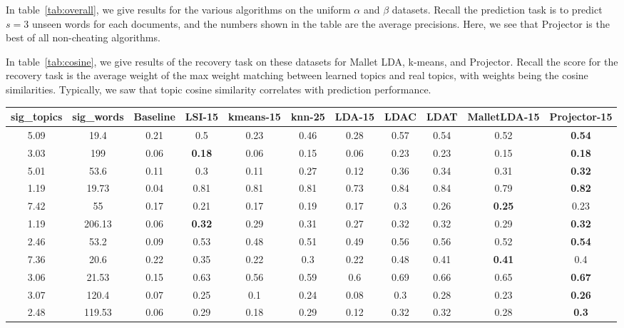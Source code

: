 In table~\ref{tab:overall}, we give results for the various algorithms on the uniform $\alpha$ and $\beta$ datasets. Recall the prediction task is to predict $s=3$ unseen words for each documents, and the numbers shown in the table are the average precisions. Here, we see that Projector is the best of all non-cheating algorithms. 

In table~\ref{tab:cosine}, we give results of the recovery task on these datasets for Mallet LDA, k-means, and Projector. Recall the score for the recovery task is the average weight of the max weight matching between learned topics and real topics, with weights being the cosine similarities. Typically, we saw that topic cosine similarity correlates with prediction performance.

\begin{table}
{\small
\begin{tabular}{|c|c|c|c|c|c|c|c|c|c|c|}
\hline 
sig\_topics &sig\_words &Baseline &LSI-15 &kmeans-15 &knn-25 &LDA-15 &LDAC &LDAT &MalletLDA-15 &Projector-15 \\
 \hline 
5.09  &19.4  &0.21  &0.5  &0.23  &0.46  &0.28  &0.57  &0.54  &0.52  &\textbf{0.54}
  \\
 \hline 
3.03  &199  &0.06  &\textbf{0.18}
  &0.06  &0.15  &0.06  &0.23  &0.23  &0.15  &\textbf{0.18}
  \\
 \hline 
5.01  &53.6  &0.11  &0.3  &0.11  &0.27  &0.12  &0.36  &0.34  &0.31  &\textbf{0.32}
  \\
 \hline 
1.19  &19.73  &0.04  &0.81  &0.81  &0.81  &0.73  &0.84  &0.84  &0.79  &\textbf{0.82}
  \\
 \hline 
7.42  &55  &0.17  &0.21  &0.17  &0.19  &0.17  &0.3  &0.26  &\textbf{0.25}
  &0.23  \\
 \hline 
1.19  &206.13  &0.06  &\textbf{0.32}
  &0.29  &0.31  &0.27  &0.32  &0.32  &0.29  &\textbf{0.32}
  \\
 \hline 
2.46  &53.2  &0.09  &0.53  &0.48  &0.51  &0.49  &0.56  &0.56  &0.52  &\textbf{0.54}
  \\
 \hline 
7.36  &20.6  &0.22  &0.35  &0.22  &0.3  &0.22  &0.48  &0.41  &\textbf{0.41}
  &0.4  \\
 \hline 
3.06  &21.53  &0.15  &0.63  &0.56  &0.59  &0.6  &0.69  &0.66  &0.65  &\textbf{0.67}
  \\
 \hline 
3.07  &120.4  &0.07  &0.25  &0.1  &0.24  &0.08  &0.3  &0.28  &0.23  &\textbf{0.26}
  \\
 \hline 
2.48  &119.53  &0.06  &0.29  &0.18  &0.29  &0.12  &0.32  &0.32  &0.28  &\textbf{0.3}
  \\

\end{tabular}}
\end{table}
